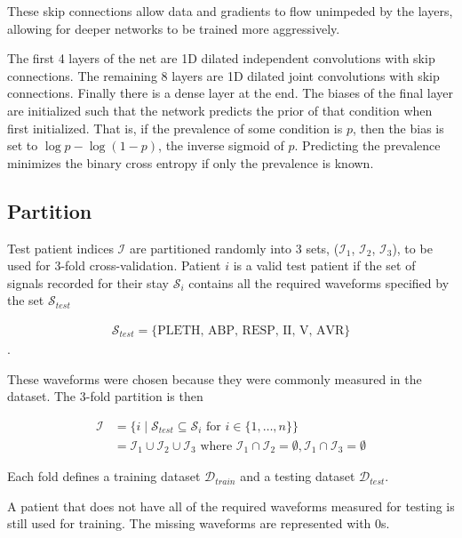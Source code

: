 These skip connections allow data and gradients to flow unimpeded by the layers, allowing for deeper networks to be trained more aggressively.

The first 4 layers of the net are 1D dilated independent convolutions with skip connections.  The remaining 8 layers are 1D dilated joint convolutions with skip connections.  Finally there is a dense layer at the end.  The biases of the final layer are initialized such that the network predicts the prior of that condition when first initialized.  That is, if the prevalence of some condition is $p$, then the bias is set to $\log p - \log(1 - p)$, the inverse sigmoid of $p$.  Predicting the prevalence minimizes the binary cross entropy if only the prevalence is known.


\subsection{Partition}

Test patient indices $\mathcal{I}$ are partitioned randomly into 3 sets, ($\mathcal{I}_1$, $\mathcal{I}_2$, $\mathcal{I}_3$), to be used for 3-fold cross-validation.  Patient $i$ is a valid test patient if the set of signals recorded for their stay $\mathcal{S}_i$ contains all the required waveforms specified by the set $\mathcal{S}_{test}$

\begin{gather}
    \mathcal{S}_{test} = \{ \text{PLETH, ABP, RESP, II, V, AVR} \}
\end{gather}.

These waveforms were chosen because they were commonly measured in the dataset.  The 3-fold partition is then

\begin{align}
    \mathcal{I} 
        &= \{
            i \mid \mathcal{S}_{test} \subseteq \mathcal{S}_i 
            \text{ for } i \in \{1, \dots, n\} 
        \} \\
        &= \mathcal{I}_1 \cup \mathcal{I}_2 \cup \mathcal{I}_3 \text{ where }
            \mathcal{I}_1 \cap \mathcal{I}_2 = \emptyset, \mathcal{I}_1 \cap \mathcal{I}_3 = \emptyset
\end{align}

Each fold defines a training dataset $\mathcal{D}_{train}$ and a testing dataset $\mathcal{D}_{test}$.

A patient that does not have all of the required waveforms measured for testing is still used for training.  The missing waveforms are represented with 0s.

